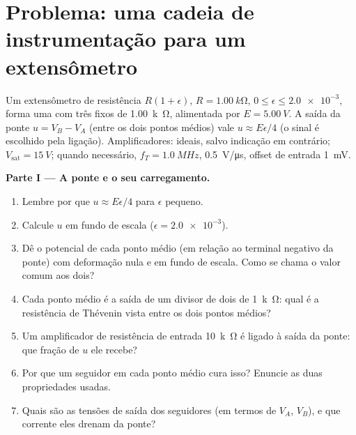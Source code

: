 \section{Problema: uma cadeia de instrumentação para um extensômetro}

\begin{problem}
\label{pb:b1:operational-amplifier:1}
Um extensômetro de resistência $R(1 + \epsilon)$, $R = \qty{1.00}{k\ohm}$,
$0 \leq \epsilon \leq \num{2.0e-3}$, forma uma  com
três  fixos de \qty{1.00}{k\ohm}, alimentada por $E = \qty{5.00}{V}$.
A saída da ponte $u = V_B - V_A$ (entre os dois pontos médios) vale
$u \approx E\epsilon/4$ (o sinal é escolhido pela ligação). Amplificadores:
ideais, salvo indicação em contrário; $V_{\mathrm{sat}} = \qty{15}{V}$; quando necessário,
$f_T = \qty{1.0}{MHz}$,  \qty{0.5}{V/\micro s}, offset de entrada
\qty{1}{mV}.

\medskip
\noindent\textbf{Parte I --- A ponte e o seu carregamento.}
\begin{enumerate}
  \item Lembre por que $u \approx E\epsilon/4$ para $\epsilon$ pequeno.
  \item Calcule $u$ em fundo de escala ($\epsilon = \num{2.0e-3}$).
  \item Dê o potencial de cada ponto médio (em relação ao terminal
        negativo da ponte) com deformação nula e em fundo de escala. Como se
        chama o valor comum aos dois?
  \item Cada ponto médio é a saída de um divisor de dois  de \qty{1}{k\ohm}:
        qual é a resistência de Thévenin vista entre os
        dois pontos médios?
  \item Um amplificador de resistência de entrada \qty{10}{k\ohm} é
        ligado à saída da ponte: que fração de $u$ ele
        recebe?
  \item Por que um seguidor em cada ponto médio cura isso? Enuncie as duas
        propriedades usadas.
  \item Quais são as tensões de saída dos seguidores (em termos de $V_A$,
        $V_B$), e que corrente eles drenam da ponte?
\end{enumerate}


\end{problem}
